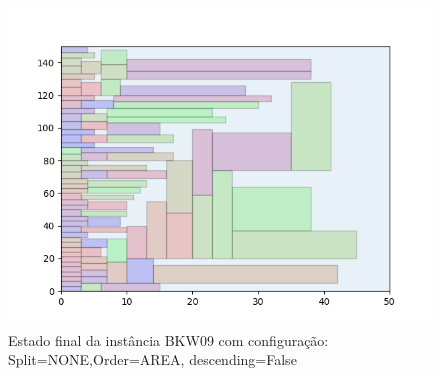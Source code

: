 \begin{figure}[H]
    \centering
    \caption[]{Estado final da instância BKW09 com configuração: Split=NONE,Order=AREA, descending=False}
    \label{fig:bkw09-none-area-false}
    \includegraphics[scale=0.5]{output/figures/bkw/bkw09/none/area/false/000}
\end{figure}